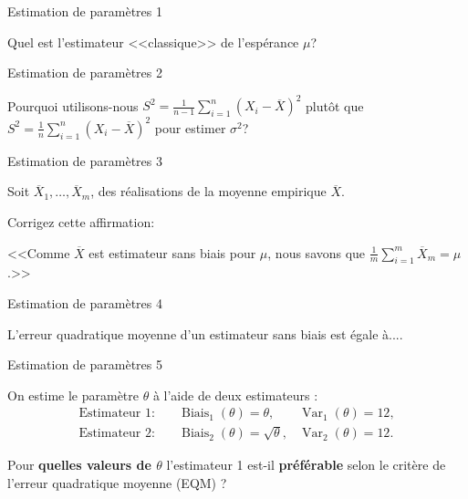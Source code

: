 \documentclass{BeamerTemplate}
\begin{document}
\begin{frame}{Estimation de paramètres 1}\label{est1}
\begin{center}

Quel est l'estimateur <<classique>> de l'espérance $\mu$?

\end{center}

\end{frame}


\begin{frame}{Estimation de paramètres 2}\label{est2}
\begin{center}

Pourquoi utilisons-nous $\displaystyle S^2=\frac{1}{n-1}\sum_{i=1}^n(X_i-\overline{X})^2$ plutôt que $\displaystyle S^2=\frac{1}{n}\sum_{i=1}^n(X_i-\overline{X})^2$ pour estimer $\sigma^2$?

\end{center}

\end{frame}

\begin{frame}{Estimation de paramètres 3}\label{est3}
\begin{center}
Soit $\overline{X}_1, \hdots , \overline{X}_m$, des réalisations de la moyenne empirique $\overline{X}$.

\medskip
Corrigez cette affirmation:

<<Comme $\overline{X}$ est estimateur sans biais pour $\mu$, nous savons que $\displaystyle \frac{1}{m}\sum_{i=1}^m \overline{X}_m=\mu$.>>

\end{center}

\end{frame}

\begin{frame}{Estimation de paramètres 4}\label{est4}
\begin{center}

L'erreur quadratique moyenne d'un estimateur sans biais est égale à....

\end{center}

\end{frame}

\begin{frame}{Estimation de paramètres 5}\label{est5}
\begin{center}

On estime le paramètre $\theta$ à l'aide de deux estimateurs :
\[
\begin{aligned}
\text{Estimateur 1:}\quad 
& \operatorname{Biais}_1(\theta)=\theta, 
& \operatorname{Var}_1(\theta)=12,\\[2mm]
\text{Estimateur 2:}\quad 
& \operatorname{Biais}_2(\theta)=\sqrt{\theta}, 
& \operatorname{Var}_2(\theta)=12.
\end{aligned}
\]

Pour \textbf{quelles valeurs de $\theta$} l’estimateur 1 est-il \textbf{préférable} selon le critère de l’erreur quadratique moyenne (EQM) ?

\end{center}
\end{frame}
\end{document}
